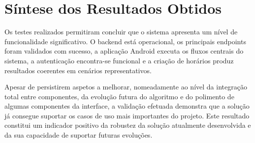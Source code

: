 \section{Síntese dos Resultados Obtidos}

Os testes realizados permitiram concluir que o sistema apresenta um nível de funcionalidade significativo. O backend está operacional, os principais endpoints foram validados com sucesso, a aplicação Android executa os fluxos centrais do sistema, a autenticação encontra-se funcional e a criação de horários produz resultados coerentes em cenários representativos.

Apesar de persistirem aspetos a melhorar, nomeadamente ao nível da integração total entre componentes, da evolução futura do algoritmo e do polimento de algumas componentes da interface, a validação efetuada demonstra que a solução
já consegue suportar os casos de uso mais importantes do projeto.
Este resultado constitui um indicador positivo da robustez da solução atualmente desenvolvida e da sua capacidade de suportar futuras evoluções.
